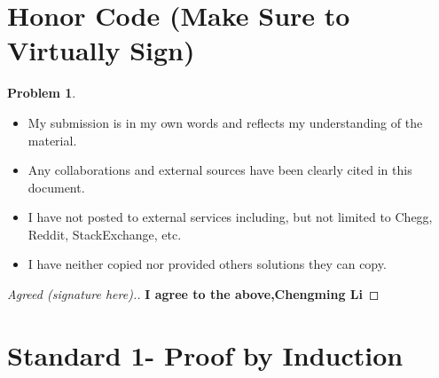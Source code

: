 \documentclass[11pt]{article}
\theoremstyle{definition}
\theoremstyle{definition}
\newtheorem{required}{Problem}
\theoremstyle{definition}
\begin{document}
\section{Honor Code (Make Sure to Virtually Sign)} \label{HonorCode}

\begin{required}
\begin{itemize}
\item My submission is in my own words and reflects my understanding of the material.
\item Any collaborations and external sources have been clearly cited in this document.
\item I have not posted to external services including, but not limited to Chegg, Reddit, StackExchange, etc.
\item I have neither copied nor provided others solutions they can copy.
\end{itemize}

\end{required}

\begin{proof}[Agreed (signature here).]
\textbf{I agree to the above,Chengming Li}
\end{proof}


\newpage
\section{Standard 1- Proof by Induction}
\end{document}
